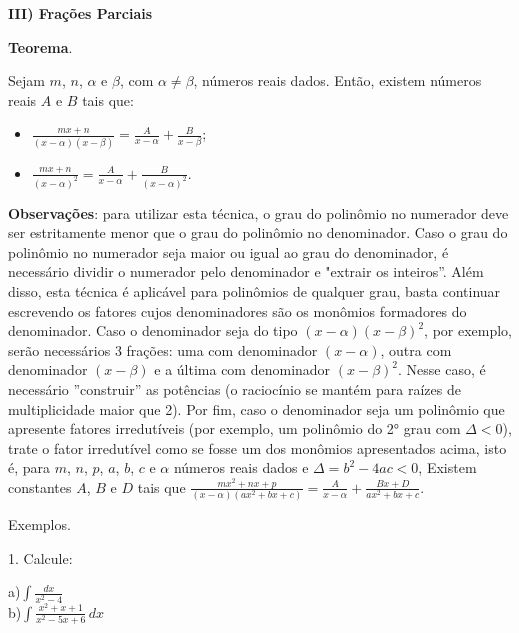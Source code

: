 \documentclass{article}
\begin{document}
{\begin{newpage}
\par
\vspace{0.3cm}
\textbf{III) Frações Parciais}   
\par \textbf{Teorema}.\par
Sejam $m$, $n$, $\alpha $ e $\beta $, com $\alpha\neq\beta $, números reais dados. Então, existem números reais $A$ e $B$ tais que:
\begin{itemize}
\item $\displaystyle{\frac{mx + n}{(x-\alpha )(x-\beta )} = \frac{A}{x-\alpha } + \frac{B}{x-\beta }}$;
\item $\displaystyle{\frac{mx+n}{(x-\alpha )^2} = \frac{A}{x-\alpha } + \frac{B}{(x-\alpha )^2}}$.
\end{itemize}
\par\textbf{Observações}: para utilizar esta técnica, o grau do polinômio no numerador deve ser estritamente menor que o grau do polinômio no denominador. Caso o grau do polinômio no numerador seja maior ou igual ao grau do denominador, é necessário dividir o numerador pelo denominador e "extrair os inteiros''. Além disso, esta técnica é aplicável para polinômios de qualquer grau, basta continuar escrevendo os fatores cujos denominadores são os monômios formadores do denominador. Caso o denominador seja do tipo $(x-\alpha )(x-\beta )^{2}$, por exemplo, serão necessários 3 frações: uma com denominador $(x-\alpha )$, outra com denominador $(x-\beta )$ e a última com denominador $(x-\beta )^2$. Nesse caso, é necessário ''construir'' as potências (o raciocínio se mantém para raízes de multiplicidade maior que 2). Por fim, caso o denominador seja um polinômio que apresente fatores irredutíveis (por exemplo, um polinômio do 2° grau com $\Delta < 0$), trate o fator irredutível como se fosse um dos monômios apresentados acima, isto é, para $m$, $n$, $p$, $a$, $b$, $c$ e $\alpha $ números reais dados e $\Delta = b^{2} - 4ac < 0$, Existem constantes $A$, $B$ e $D$ tais que $\displaystyle{\frac{mx^{2} + nx + p}{(x-\alpha )(ax^{2} + bx + c)} = \frac{A}{x-\alpha } + \frac{Bx + D}{ax^{2} + bx + c}}$.
\par
\vspace{0.3cm}
Exemplos.
\par
\begin{flushleft}
1. Calcule:
\end{flushleft}
\par
\begin{multicols}{3}
a)$\displaystyle{\int \frac{dx}{x^2 - 4}}$\\
b)$\displaystyle{\int \frac{x^2 + x + 1}{x^2 - 5x + 6}\, dx}$\\

\end{multicols}
\end{newpage}}
\end{document}
